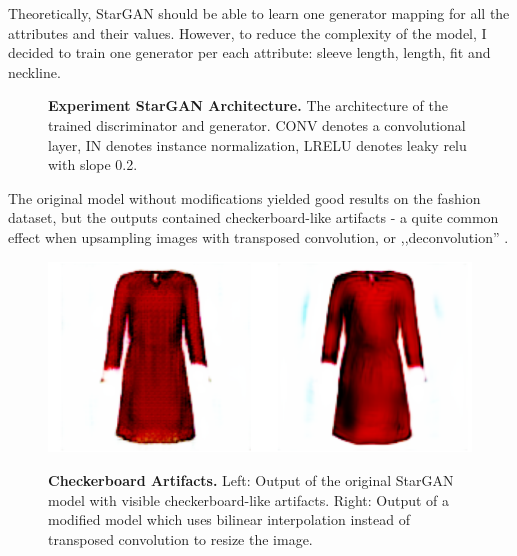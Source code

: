 \documentclass[12pt]{report}
\begin{document}
Theoretically, StarGAN should be able to learn one generator mapping for all the attributes and their values. However, to reduce the complexity of the model, I decided to train one generator per each attribute: sleeve length, length, fit and neckline.

\vspace{0.5cm}
\begin{figure}[h]
\centering
{}\vspace{.5cm}
\caption{\label{fig:stargan_arch} \textbf{Experiment StarGAN Architecture.} The architecture of the trained  discriminator and generator. CONV denotes a convolutional layer, IN denotes instance normalization, LRELU denotes leaky relu with slope 0.2.}
\end{figure}

The original model without modifications yielded good results on the fashion dataset, but the outputs contained checkerboard-like artifacts - a quite common effect when upsampling images with transposed convolution, or ,,deconvolution'' \cite{odena2016deconvolution}.

\begin{figure}[h]
\centering
{\includegraphics[width=.5\linewidth]{04_experiments/stargan/checkerboard}}
\caption{\label{fig:stargan_checkerboard} \textbf{Checkerboard Artifacts.} Left: Output of the original StarGAN model with visible checkerboard-like artifacts. Right: Output of a modified model which uses bilinear interpolation instead of transposed convolution to resize the image.}
\end{figure}
\end{document}
